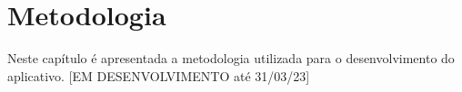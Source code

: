 \chapter{Metodologia}
Neste capítulo é apresentada a metodologia utilizada para o desenvolvimento do aplicativo. 
[EM DESENVOLVIMENTO até 31/03/23]








